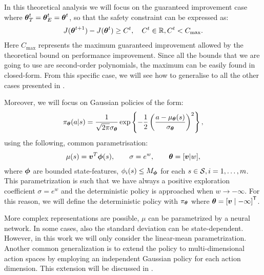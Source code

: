 In this theoretical analysis we will focus on the guaranteed improvement case where ${{\boldsymbol{\theta}}}^{t}_T={\boldsymbol{\theta}}_E^t = {\boldsymbol{\theta}}^t$, so that the safety constraint can be expressed as:
%
\begin{align*}
J({\boldsymbol{\theta}}^{t+1}) - J({\boldsymbol{\theta}}^t) \geq C^t, \quad C^t \in \mathbb{R}, C^t < C_{\text{max}}.
\end{align*}
Here $C_\text{max}$ represents the maximum guaranteed improvement allowed by the theoretical bound on performance improvement. Since all the bounds that we are going to use are second-order polynomials, the maximum can be easily found in closed-form. From this specific case, we will see how to generalise to all the other cases presented in .

Moreover, we will focus on Gaussian policies of the form:
\[
	\pi_{{\boldsymbol{\theta}}}(a\vert s) = \frac{1}{\sqrt{2\pi}\sigma_{{\boldsymbol{\theta}}}}\exp\left\{-\frac{1}{2}\left(\frac{a - \mu_{{\boldsymbol{\theta}}}(s)}{\sigma_{{\boldsymbol{\theta}}}}\right)^2\right\},
\]
using the following, common parametrisation:
\begin{align}\label{eq:parametrization}
\mu(s)=\boldsymbol{v}^T\boldsymbol{\phi}(s), \qquad \sigma=e^w, \qquad {\boldsymbol{\theta}}=[\boldsymbol{v}\vert w],
\end{align}
where $\boldsymbol{\phi}$ are bounded state-features, \ie $\phi_i(s) \leq M_{\boldsymbol{\phi}}$ for each $s\in\mathcal{S}, i=1,\dots,m$.
This parametrization is such that we have always a positive exploration coefficient $\sigma=e^w$ and the deterministic policy is approached when $w \rightarrow -\infty$. For this reason, we will define the deterministic policy with $\pi_{{\boldsymbol{\theta}}}$ where ${\boldsymbol{\theta}} = {[\boldsymbol{v} \mid -\infty]}^{\mathsf{T}}$.


More complex representations are possible, \eg $\mu$ can be parametrized by a neural network. In some cases, also the standard deviation can be state-dependent. However, in this work we will only consider the linear-mean parametrization. \\
Another common generalization is to extend the policy to multi-dimensional action spaces by employing an independent Gaussian policy for each action dimension. This extension will be discussed in .

